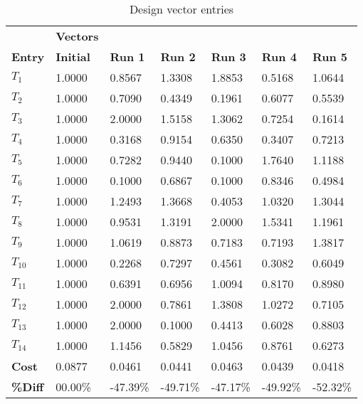 \begin{table}[H]
\centering
\begin{tabular}{lllllll}
\textbf{} & \cellcolor[HTML]{EFEFEF}\textbf{Vectors} & \textbf{} & \textbf{} & \textbf{} & \textbf{} & \textbf{} \\
\rowcolor[HTML]{EFEFEF} \cellcolor[HTML]{EFEFEF}\textbf{Entry} & \cellcolor[HTML]{EFEFEF}\textbf{Initial} & \cellcolor[HTML]{EFEFEF}\textbf{Run 1} & \cellcolor[HTML]{EFEFEF}\textbf{Run 2} & \cellcolor[HTML]{EFEFEF}\textbf{Run 3} & \cellcolor[HTML]{EFEFEF}\textbf{Run 4} & \cellcolor[HTML]{EFEFEF}\textbf{Run 5} \\
$T_1$ & 1.0000 & 0.8567 & 1.3308 & 1.8853 & 0.5168 & 1.0644 \\
$T_2$ & 1.0000 & 0.7090 & 0.4349 & 0.1961 & 0.6077 & 0.5539 \\
$T_3$ & 1.0000 & 2.0000 & 1.5158 & 1.3062 & 0.7254 & 0.1614 \\
$T_4$ & 1.0000 & 0.3168 & 0.9154 & 0.6350 & 0.3407 & 0.7213 \\
$T_5$ & 1.0000 & 0.7282 & 0.9440 & 0.1000 & 1.7640 & 1.1188 \\
$T_6$ & 1.0000 & 0.1000 & 0.6867 & 0.1000 & 0.8346 & 0.4984 \\
$T_7$ & 1.0000 & 1.2493 & 1.3668 & 0.4053 & 1.0320 & 1.3044 \\
$T_8$ & 1.0000 & 0.9531 & 1.3191 & 2.0000 & 1.5341 & 1.1961 \\
$T_9$ & 1.0000 & 1.0619 & 0.8873 & 0.7183 & 0.7193 & 1.3817 \\
$T_10$ & 1.0000 & 0.2268 & 0.7297 & 0.4561 & 0.3082 & 0.6049 \\
$T_11$ & 1.0000 & 0.6391 & 0.6956 & 1.0094 & 0.8170 & 0.8980 \\
$T_12$ & 1.0000 & 2.0000 & 0.7861 & 1.3808 & 1.0272 & 0.7105 \\
$T_13$ & 1.0000 & 2.0000 & 0.1000 & 0.4413 & 0.6028 & 0.8803 \\
$T_14$ & 1.0000 & 1.1456 & 0.5829 & 1.0456 & 0.8761 & 0.6273 \\
\rowcolor[HTML]{EFEFEF} 
\cellcolor[HTML]{EFEFEF}\textbf{Cost} & \cellcolor[HTML]{EFEFEF}0.0877 & 0.0461 & 0.0441 & 0.0463 & 0.0439 & 0.0418 \\
\rowcolor[HTML]{EFEFEF} 
\cellcolor[HTML]{EFEFEF}\textbf{\%Diff} & \cellcolor[HTML]{EFEFEF} 00.00\% &-47.39\% & -49.71\% & -47.17\% & -49.92\% & -52.32\% \\
\end{tabular}
\caption{Design vector entries}
\label{tab:DesignVectorEntries}
\end{table}
